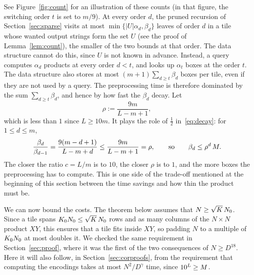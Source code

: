 See Figure~\ref{fig:count} for an illustration of these counts (in that figure, the switching order $t$ is set to $m/9$). At every order $d$, the pruned recursion of Section~\ref{sec:sparse} visits at most $\min\{|U|\alpha_d,\beta_d\}$ leaves of order $d$ in a tile whose wanted output strings form the set $U$ (see the proof of Lemma~\ref{lem:count}), the smaller of the two bounds at that order. The data structure cannot do this, since $U$ is not known in advance. Instead, a query computes $\alpha_d$ products at every order $d<t$, and looks up $\alpha_t$ boxes at the order $t$. The data structure also stores at most $(m+1)\sum_{d\ge t}\beta_d$ boxes per tile, even if they are not used by a query. The preprocessing time is therefore dominated by the sum $\sum_{d\ge t}\beta_d$, and hence by how fast the $\beta_d$ decay. Let
\[
\rho:=\frac{9m}{L-m+1},
\]
which is less than $1$ since $L\ge10m$. It plays the role of $\frac12$ in~\eqref{eq:decay}: for $1\le d\le m$,
\begin{equation}\label{eq:gendecay}
\frac{\beta_d}{\beta_{d-1}}=\frac{9(m-d+1)}{L-m+d}\le\frac{9m}{L-m+1}=\rho,\qquad\text{so}\qquad\beta_d\le\rho^d\,M .
\end{equation}
The closer the ratio $c=L/m$ is to $10$, the closer $\rho$ is to $1$, and the more boxes the preprocessing has to compute. This is one side of the trade-off mentioned at the beginning of this section between the time savings and how thin the product must be.

We can now bound the costs. The theorem below assumes that $N\ge\sqrt K\,N_0$. Since a tile spans $K_0N_0\le\sqrt K\,N_0$ rows and as many columns of the $N\times N$ product $XY$, this ensures that a tile fits inside $XY$, so padding $N$ to a multiple of $K_0N_0$ at most doubles it. We checked the same requirement in Section~\ref{sec:proof}, where it was the first of the two consequences of $N\ge D^{18}$. Here it will also follow, in Section~\ref{sec:corproofs}, from the requirement that computing the encodings takes at most $N^2/D^{\gamma}$ time, since $10^L\ge M$.

